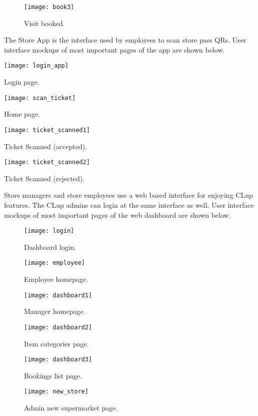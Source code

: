 \vspace{1cm}

\begin{figure}[H]
	\centering
	\texttt{[image: book3]}
	\caption{Visit booked.}
\end{figure}

\clearpage
The Store App is the interface used by employees to scan store pass QRs.
User interface mockups of most important pages of the app are shown below.
\vspace{0.5cm}

\begin{minipage}{.5\textwidth}
\centering
\texttt{[image: login\_app]}
\captionsetup{type=figure}
\caption{Login page.}
\end{minipage}%
\begin{minipage}{.5\textwidth}
\centering
\texttt{[image: scan\_ticket]}
\captionsetup{type=figure}
\caption{Home page.}
\end{minipage}

\vspace{1cm}

\begin{minipage}{.5\textwidth}
\centering
\texttt{[image: ticket\_scanned1]}
\captionsetup{type=figure}
\caption{Ticket Scanned (accepted).}
\end{minipage}%
\begin{minipage}{.5\textwidth}
\centering
\texttt{[image: ticket\_scanned2]}
\captionsetup{type=figure}
\caption{Ticket Scanned (rejected).}
\end{minipage}

\clearpage

Store managers and store employees use a web based interface for enjoying CLup features. The CLup admins can login at the same interface as well.
User interface mockups of most important pages of the web dashboard are shown below.
\vspace{0.5cm}
\begin{figure}[H]
	\centering
	\texttt{[image: login]}
	\caption{Dashboard login.}
\end{figure}
\begin{figure}[H]
	\centering
	\texttt{[image: employee]}
	\caption{Employee homepage.}
\end{figure}
\begin{figure}[H]
	\centering
	\texttt{[image: dashboard1]}
	\caption{Manager homepage.}
\end{figure}
\begin{figure}[H]
	\centering
	\texttt{[image: dashboard2]}
	\caption{Item categories page.}
\end{figure}
\begin{figure}[H]
	\centering
	\texttt{[image: dashboard3]}
	\caption{Bookings list page.}
\end{figure}
\begin{figure}[H]
	\centering
	\texttt{[image: new\_store]}
	\caption{Admin new supermarket page.}
\end{figure}

